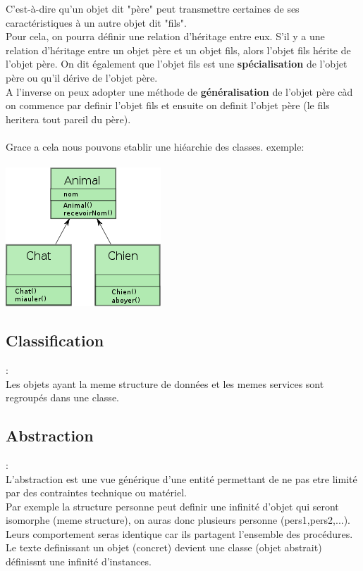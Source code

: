 \documentclass[a4paper,12pt,openany]{book}
\begin{document}
C’est-à-dire qu’un objet dit "père" peut transmettre certaines de ses caractéristiques à un autre objet dit "fils".\\
Pour cela, on pourra définir une relation d’héritage entre eux. S’il y a une relation d’héritage entre un objet père et un objet fils, alors l’objet fils hérite de l’objet père. On dit également que l’objet fils est une \textbf{spécialisation} de l’objet père ou qu’il dérive de l’objet père.\\
A l'inverse on peux adopter une méthode de \textbf{généralisation} de l'objet père càd on commence par definir l'objet fils et ensuite on definit l'objet père (le fils heritera tout pareil du père).\\ 
\\
Grace a cela nous pouvons etablir une hiéarchie des classes. exemple:\\
\\
\includegraphics[width=0.35\linewidth,center]{img/poo-heritage.png}

\subsection{Classification}: \\

Les objets ayant la meme structure de données et les memes services sont regroupés dans une classe.\\

\subsection{Abstraction}: \\

L'abstraction est une vue générique d'une entité permettant de ne pas etre limité par des contraintes technique ou matériel.\\
Par exemple la structure personne peut definir une infinité d'objet qui seront isomorphe (meme structure), on auras donc plusieurs personne (pers1,pers2,...).\\
Leurs comportement seras identique car ils partagent l'ensemble des procédures.\\
Le texte definissant un objet (concret) devient une classe (objet abstrait) définissnt une infinité d'instances.\\
\end{document}
